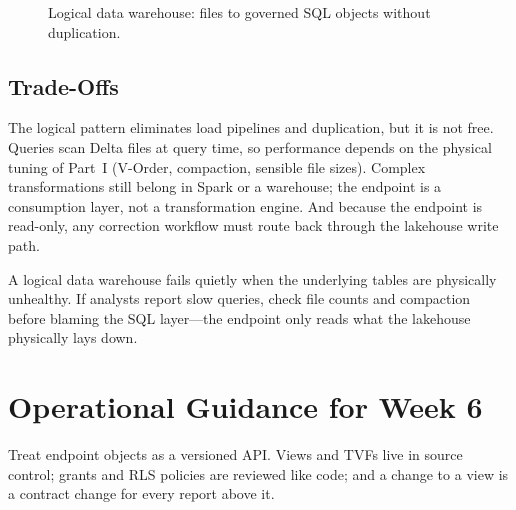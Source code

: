 \begin{figure}[H]
    \centering
    \caption{Logical data warehouse: files to governed SQL objects without duplication.}
    \label{fig:chapter6-logical-dw}
\end{figure}

\subsection{Trade-Offs}
The logical pattern eliminates load pipelines and duplication, but it is not free. Queries scan Delta files at query time, so performance depends on the physical tuning of Part~I (V-Order, compaction, sensible file sizes). Complex transformations still belong in Spark or a warehouse; the endpoint is a consumption layer, not a transformation engine. And because the endpoint is read-only, any correction workflow must route back through the lakehouse write path.

\begin{pitfall}
A logical data warehouse fails quietly when the underlying tables are physically unhealthy. If analysts report slow queries, check file counts and compaction before blaming the SQL layer---the endpoint only reads what the lakehouse physically lays down.
\end{pitfall}

\section{Operational Guidance for Week 6}
Treat endpoint objects as a versioned API. Views and TVFs live in source control; grants and RLS policies are reviewed like code; and a change to a view is a contract change for every report above it.

